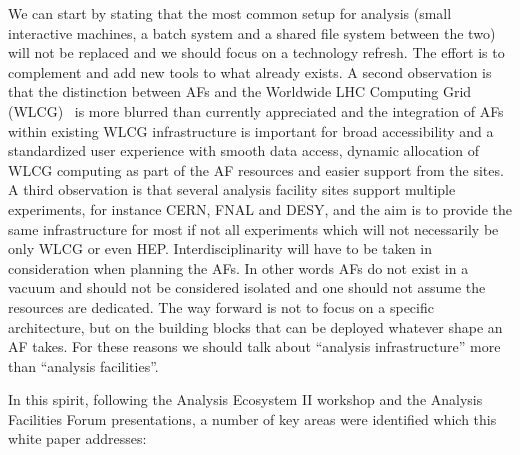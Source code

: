 We can start by stating that the most common setup for analysis (small interactive machines, a batch system and a shared file system between the two) will not be replaced and we should focus on a technology refresh. The effort is to complement and add new tools to what already exists.  A second observation is that the distinction between AFs and the Worldwide LHC Computing Grid (WLCG)~\cite{wlcg} is more blurred than currently appreciated and the integration of AFs within existing WLCG infrastructure is important for broad accessibility and a standardized user experience with smooth data access, dynamic allocation of WLCG computing as part of the AF resources and easier support from the sites. A third observation is that several analysis facility sites support multiple experiments, for instance CERN, FNAL and DESY, and the aim is to provide the same infrastructure for most if not all experiments which will not necessarily be only WLCG or even HEP. Interdisciplinarity will have to be taken in consideration when planning the AFs. In other words AFs do not exist in a vacuum and should not be considered isolated and one should not assume the resources are dedicated. The way forward is not to focus on a specific architecture, but on the building blocks that can be deployed whatever shape an AF takes. For these reasons we should talk about “analysis infrastructure” more than “analysis facilities”.

In this spirit, following the Analysis Ecosystem II workshop and the Analysis Facilities Forum presentations, a number of key areas were identified which this white paper addresses:

